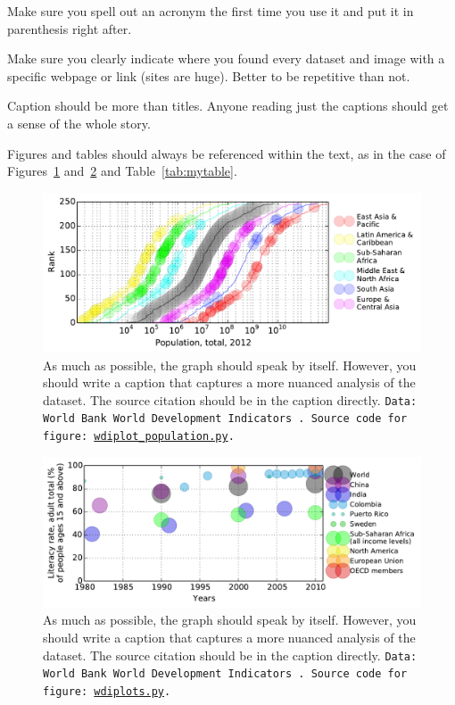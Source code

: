 \documentclass[11pt, twocolumn]{article}
\begin{document}
Make sure you spell out an acronym the first time you use it and put it in parenthesis right after.

Make sure you clearly indicate where you found every dataset and image with a specific webpage or link (sites are huge). Better to be repetitive than not.

Caption should be more than titles. Anyone reading just the captions should get a sense of the whole story.

Figures and tables should always be referenced within the text, as in the case of Figures~\ref{fig:myfigure} and~\ref{fig:myfigure2} and Table~\ref{tab:mytable}.

\begin{figure}
\centering 
\includegraphics[width=\textwidth]{Populati2012.pdf}\caption{\label{fig:myfigure}As much as possible, the graph should speak by itself. However, you should write a caption that captures a more nuanced analysis of the dataset. The source citation should be in the caption directly. {\tt Data: World Bank World Development Indicators~\cite{wdi}. Source code for figure:~\href{https://github.com/jabb1123/RADical/blob/master/Oscar/wdiplot_population.py}{wdiplot\_population.py}.}} 
\end{figure}

\begin{figure}
\centering 
\includegraphics[width=\textwidth]{Literacy.pdf}\caption{\label{fig:myfigure2}As much as possible, the graph should speak by itself. However, you should write a caption that captures a more nuanced analysis of the dataset. The source citation should be in the caption directly. {\tt Data: World Bank World Development Indicators~\cite{wdi}. Source code for figure:~\href{https://github.com/jabb1123/RADical/blob/master/Oscar/wdiplots.py}{wdiplots.py}.}}
\end{figure}
\end{document}
